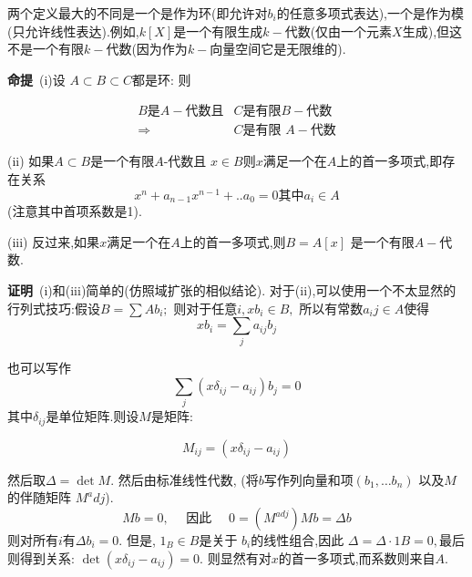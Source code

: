 \documentclass[UTF8]{book}
\begin{document}
		
		两个定义最大的不同是一个是作为环(即允许对$ b_{i} $的任意多项式表达),一个是作为模(只允许线性表达).例如,$ k[X] $是一个有限生成$ k- $代数(仅由一个元素$ X $生成),但这不是一个有限$ k- $代数(因为作为$ k- $向量空间它是无限维的).
		
		
		\textbf{命提}\  (i)设 $A \subset B \subset C$都是环: 则
		
		\begin{equation*}
		\begin{split}
		B\text{是} A -\text{代数且}&C \text{是有限} B -\text{代数}\\
		\Rightarrow &C \text {是有限 }A -\text{代数}
		\end{split}
		\end{equation*}
		
		
		(ii) 如果$A \subset B$是一个有限$ A $-代数且 $x \in B$则$x$满足一个在$A$上的首一多项式,即存在关系
		\begin{equation*}
		x^{n}+a_{n-1} x^{n-1}+. . a_{0}=0 \text {其中}a_{i} \in A
		\end{equation*}
		(注意其中首项系数是1).
		
		
		(iii) 反过来,如果$x$满足一个在$A$上的首一多项式,则$B=A[x]$ 是一个有限$ A- $代数.
		
		
		\textbf{证明}\  (i)和(iii)简单的(仿照域扩张的相似结论). 对于(ii),可以使用一个不太显然的行列式技巧:假设$B =\sum A b _{ i } ;$ 则对于任意$i ,  x b_{ i } \in B ,$ 所以有常数$a_ij \in A$使得
		\begin{equation*}
		x b_{i}=\sum_{j} a_{i j} b_{j}
		\end{equation*}
		
		
		也可以写作
		\begin{equation*}
		\sum_{j}\left(x \delta_{i j}-a_{i j}\right) b_{j}=0
		\end{equation*}
		其中$\delta_{ ij }$是单位矩阵.则设$M$是矩阵:
		
		\begin{equation*}
		M _{ i j }=\left(x \delta_{ i j }- a _{ i j }\right)
		\end{equation*}
		
		然后取$\Delta=\operatorname{det} M .$ 然后由标准线性代数, (将$b$写作列向量和项$\left(b_{1}, \dots b_{n}\right)$ 以及$M$的伴随矩阵 $M^adj$).
		\begin{equation*}
		Mb =0, \quad \text { 因此 } \quad 0=\left(M ^{ adj }\right) Mb =\Delta b
		\end{equation*}
		则对所有$ i $有$\Delta b_{i}=0$. 但是, $1_{B} \in B$是关于 $b _{ i }$的线性组合,因此 $\Delta=\Delta \cdot 1 B =0,$最后则得到关系: $\operatorname{det}\left(x \delta_{ ij }- a _{ ij }\right)=0 .$ 则显然有对$x$的首一多项式,而系数则来自$ A $.
		
\end{document}
